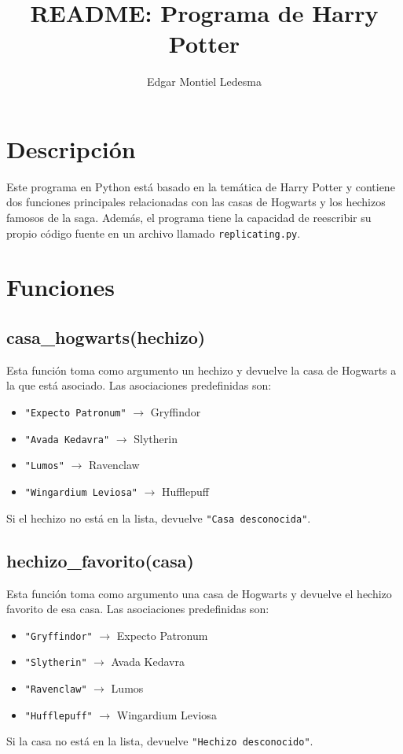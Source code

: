 \documentclass{article}
\title{README: Programa de Harry Potter}
\author{Edgar Montiel Ledesma}
\date{}
\begin{document}
\maketitle

\section{Descripción}
Este programa en Python está basado en la temática de Harry Potter y contiene dos funciones principales relacionadas con las casas de Hogwarts y los hechizos famosos de la saga. Además, el programa tiene la capacidad de reescribir su propio código fuente en un archivo llamado \texttt{replicating.py}.

\section{Funciones}
\subsection{casa\_hogwarts(hechizo)}
Esta función toma como argumento un hechizo y devuelve la casa de Hogwarts a la que está asociado. Las asociaciones predefinidas son:
\begin{itemize}
    \item \texttt{"Expecto Patronum"} $\rightarrow$ Gryffindor
    \item \texttt{"Avada Kedavra"} $\rightarrow$ Slytherin
    \item \texttt{"Lumos"} $\rightarrow$ Ravenclaw
    \item \texttt{"Wingardium Leviosa"} $\rightarrow$ Hufflepuff
\end{itemize}
Si el hechizo no está en la lista, devuelve \texttt{"Casa desconocida"}.

\subsection{hechizo\_favorito(casa)}
Esta función toma como argumento una casa de Hogwarts y devuelve el hechizo favorito de esa casa. Las asociaciones predefinidas son:
\begin{itemize}
    \item \texttt{"Gryffindor"} $\rightarrow$ Expecto Patronum
    \item \texttt{"Slytherin"} $\rightarrow$ Avada Kedavra
    \item \texttt{"Ravenclaw"} $\rightarrow$ Lumos
    \item \texttt{"Hufflepuff"} $\rightarrow$ Wingardium Leviosa
\end{itemize}
Si la casa no está en la lista, devuelve \texttt{"Hechizo desconocido"}.
\end{document}
